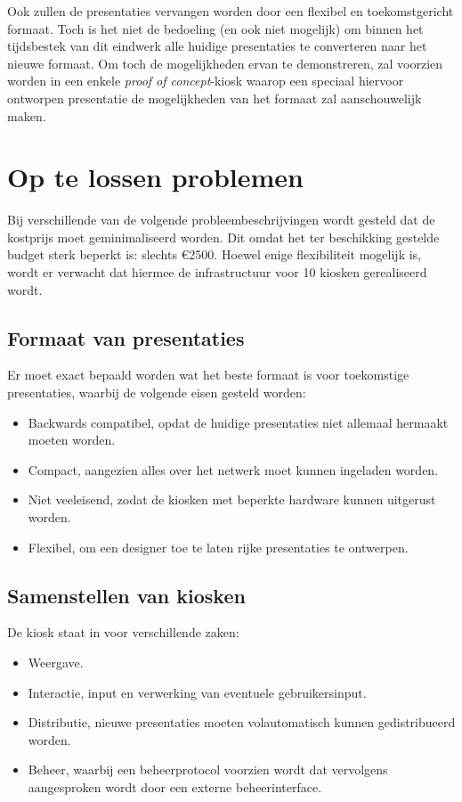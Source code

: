 \documentclass[a4paper,oneside,11pt,final]{memoir}
\begin{document}
Ook zullen de presentaties vervangen worden door een flexibel en toekomstgericht formaat. Toch is het niet de bedoeling (en ook niet mogelijk) om binnen het tijdsbestek van dit eindwerk alle huidige presentaties te converteren naar het nieuwe formaat. Om toch de mogelijkheden ervan te demonstreren, zal voorzien worden in een enkele \emph{proof of concept}-kiosk waarop een speciaal hiervoor ontworpen presentatie de mogelijkheden van het formaat zal aanschouwelijk maken.


\section{Op te lossen problemen}

Bij verschillende van de volgende probleembeschrijvingen wordt gesteld dat de kostprijs moet geminimaliseerd worden. Dit omdat het ter beschikking gestelde budget sterk beperkt is: slechts \euro 2500. Hoewel enige flexibiliteit mogelijk is, wordt er verwacht dat hiermee de infrastructuur voor 10 kiosken gerealiseerd wordt.

\subsection{Formaat van presentaties}

Er moet exact bepaald worden wat het beste formaat is voor toekomstige presentaties, waarbij de volgende eisen gesteld worden:
\begin{itemize}
	\item Backwards compatibel, opdat de huidige presentaties niet allemaal hermaakt moeten worden.
	\item Compact, aangezien alles over het netwerk moet kunnen ingeladen worden.
	\item Niet veeleisend, zodat de kiosken met beperkte hardware kunnen uitgerust worden.
	\item Flexibel, om een designer toe te laten rijke presentaties te ontwerpen.
\end{itemize}

\subsection{Samenstellen van kiosken}

De kiosk staat in voor verschillende zaken:
\begin{itemize}
	\item Weergave.
	\item Interactie, input en verwerking van eventuele gebruikersinput.
	\item Distributie, nieuwe presentaties moeten volautomatisch kunnen gedistribueerd worden.
	\item Beheer, waarbij een beheerprotocol voorzien wordt dat vervolgens aangesproken wordt door een externe beheerinterface.
\end{itemize}
\end{document}
